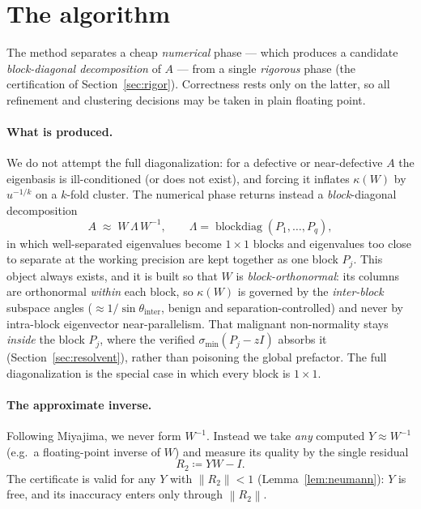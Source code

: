 \documentclass[11pt,a4paper]{article}
\newcommand{\norm}[1]{\left\|#1\right\|}
\theoremstyle{plain}
\theoremstyle{definition}
\begin{document}
\section{The algorithm}\label{sec:algo}

The method separates a cheap \emph{numerical} phase --- which produces a candidate
\emph{block-diagonal decomposition} of $A$ --- from a single \emph{rigorous} phase (the
certification of Section~\ref{sec:rigor}). Correctness rests only on the latter, so all
refinement and clustering decisions may be taken in plain floating point.

\paragraph{What is produced.} We do not attempt the full diagonalization: for a defective
or near-defective $A$ the eigenbasis is ill-conditioned (or does not exist), and forcing
it inflates $\kappa(W)$ by $u^{-1/k}$ on a $k$-fold cluster. The numerical phase returns
instead a \emph{block}-diagonal decomposition
\[
  A \;\approx\; W\,\Lambda\,W^{-1},\qquad
  \Lambda=\operatorname{blockdiag}(P_1,\dots,P_q),
\]
in which well-separated eigenvalues become $1\times1$ blocks and eigenvalues too close to
separate at the working precision are kept together as one block $P_j$. This object
always exists, and it is built so that $W$ is \emph{block-orthonormal}: its columns are
orthonormal \emph{within} each block, so $\kappa(W)$ is governed by the \emph{inter-block}
subspace angles ($\approx 1/\sin\theta_{\mathrm{inter}}$, benign and separation-controlled)
and never by intra-block eigenvector near-parallelism. That malignant non-normality stays
\emph{inside} the block $P_j$, where the verified $\sigma_{\min}(P_j-zI)$ absorbs it
(Section~\ref{sec:resolvent}), rather than poisoning the global prefactor. The full
diagonalization is the special case in which every block is $1\times1$.

\paragraph{The approximate inverse.} Following Miyajima, we never form $W^{-1}$.
Instead we take \emph{any} computed $Y\approx W^{-1}$ (e.g.\ a floating-point inverse
of $W$) and measure its quality by the single residual
\begin{equation}\label{eq:R2}
  R_2 \coloneqq YW - I .
\end{equation}
The certificate is valid for any $Y$ with $\norm{R_2}<1$ (Lemma~\ref{lem:neumann}):
$Y$ is free, and its inaccuracy enters only through $\norm{R_2}$.
\end{document}
